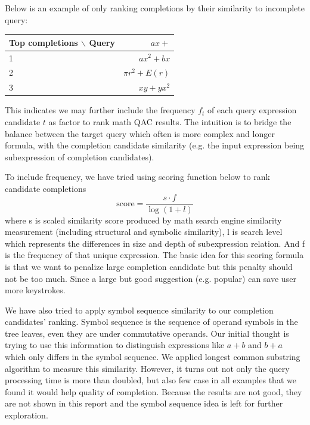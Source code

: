 \documentclass[12pt]{article} %
\begin{document}
Below is an example of only ranking completions by their similarity to incomplete query:
\begin{center}
\begin{tabular}{lr}
Top completions $\backslash$ Query  & $ ax + $ \\
\hline
 1 &  $ ax^2 + bx $ \\
 2 &  $ πr^2 + E(r) $\\
 3 &  $ xy + yx^2$ 
\end{tabular}
\end{center}

This indicates we may further include the frequency $f_t$ of
each query expression candidate $t$ as factor to rank math QAC results.
The intuition is to bridge the balance between the target query which often
is more complex and longer formula,
with the completion candidate similarity (e.g. the input expression being subexpression of completion candidates).

To include frequency, we have tried using scoring function below to rank candidate completions
$$
\text{score} = \frac{s \cdot f}{\log(1 + l)}
$$
where s is scaled similarity score produced by math search engine similarity
measurement (including structural and symbolic similarity), l is search level
which represents the differences in size and depth of subexpression relation.
And f is the frequency of that unique expression.
The basic idea for this scoring formula is that we want to penalize 
large completion candidate but this penalty should not be too much.
Since a large but good suggestion (e.g. popular) can save user more
keystrokes.

We have also tried to apply symbol sequence similarity to our completion candidates' ranking.
Symbol sequence is the sequence of operand symbols in the tree leaves, even they are under
commutative operands. Our initial thought is trying to use this information to distinguish
expressions like $a + b$ and $b + a$ which only differs in the symbol sequence.
We applied longest common substring algorithm to measure this similarity.
However, it turns out not only the query processing time is more than doubled, but also 
few case in all examples that we found it would help quality of completion.
Because the results are not good, they are not shown in this report and the symbol sequence idea
is left for further exploration.
\end{document}
